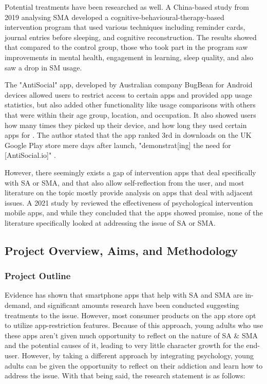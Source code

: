\documentclass[12pt]{article}
\begin{document}
Potential treatments have been researched as well. A China-based study from 2019 analysing SMA 
\autocite{RefWorks:RefID:66-hou2019social} developed a cognitive-behavioural-therapy-based intervention program 
that used various techniques including reminder cards, journal entries before sleeping, and 
cognitive reconstruction. The results showed that compared to the control group, those who took part in the 
program saw improvements in mental health, engagement in learning, sleep quality, and also saw a 
drop in SM usage. \newline

The "AntiSocial" app, developed by Australian company BugBean for Android devices allowed users to restrict access to 
certain apps and provided app usage statistics, but also added other functionality like usage comparisons
with others that were within their age group, location, and occupation. It also showed users how many 
times they picked up their device, and how long they used certain apps for 
\autocite{RefWorks:RefID:104-michael2017addicted}. The author stated that the app ranked 3rd in downloads on the 
UK Google Play store mere days after launch, "demonstrat[ing] the need 
for [AntiSocial.io]" \autocite{RefWorks:RefID:104-michael2017addicted}.\newline

However, there seemingly exists a gap of intervention apps that deal specifically with SA or SMA, and that also 
allow self-reflection from the user, and most literature on the topic mostly provide 
analysis on apps that deal with adjacent issues. A 2021 study by \textcite{RefWorks:RefID:75-oliveira2021effectiveness} 
reviewed the effectiveness of psychological intervention mobile apps, and while they 
concluded that the apps showed promise, none of 
the literature specifically looked at addressing the issue of SA or SMA.\newline 

\subsection{Project Overview, Aims, and Methodology}

\subsubsection{Project Outline}

Evidence has shown that smartphone apps that help with SA and SMA are 
in-demand, and significant amounts research have been conducted suggesting treatments to the 
issue. However, most consumer products on the app store opt to utilize app-restriction features. Because of 
this approach, young adults who use these apps aren't given much opportunity to reflect on the nature of SA \& SMA 
and the potential causes of it, leading to very little character growth for the end-user. However, by taking a 
different approach by integrating psychology, young adults can be given the opportunity to reflect on their 
addiction and learn how to address the issue. With that being said, the research statement is as follows: \newline
\end{document}
